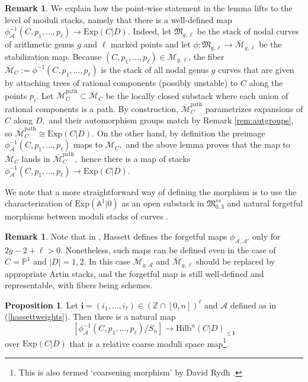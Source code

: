\documentclass[10.5pt]{amsart}
\theoremstyle{definition}
\theoremstyle{definition}
\theoremstyle{definition}
\theoremstyle{definition}
\newtheorem{proposition}[theorem]{Proposition}
\newtheorem{remark}[theorem]{Remark}
\newcommand{\ol}[1]{\overline{#1}}
\newcommand{\Mcal}{\mathcal{M}}
\newcommand{\Mbar}{\ol{\Mcal}}
\newcommand{\Hilb}{\mathrm{Hilb}}
\newcommand{\cA}{\mathcal{A}}
\newcommand{\bi}{\boldsymbol{i}}
\begin{document}
\begin{remark}\label{rem:Aexp}
    We explain how the point-wise statement in the lemma lifts to the level of moduli stacks, namely that there is a well-defined map $\phi^{-1}_{\mathcal{A}}(C, p_1,\dots,p_\ell)\to \mathrm{Exp}(C|D).$ Indeed, let $\mathfrak{M}_{g, \ell}$ be the stack of nodal curves of arithmetic genus $g$ and $\ell$ marked points and let $\phi:\mathfrak{M}_{g,\ell}\to \Mbar_{g, \ell}$ be the stabilization map. Because $(C,p_1,\dots, p_\ell) \in \mathcal{M}_{g,\ell}$,  the fiber $\Mbar_C:=\phi^{-1}(C,p_1,\dots, p_\ell)$ is the stack of all nodal genus $g$ curves that are given by attaching trees of rational components (possibly unstable) to $C$ along the points $p_i$. Let $\Mbar_C^{\mathrm{path}}\subset \Mbar_{C}$ be the locally closed substack where each union of rational components is a path. By construction, $\Mbar_C^{\mathrm{path}}$ parametrizes expansions of $C$ along $D,$ and their automorphism groups match by Remark \ref{rem:autgroups}, so $\Mbar_C^{\mathrm{path}}\cong \mathrm{Exp}(C|D).$ On the other hand, by definition the preimage $\phi_{\mathcal{A}}^{-1}(C, p_1,\dots,p_\ell)$ maps to $\Mbar_{C},$ and the above lemma proves that the map to $\Mbar_{C}$ lands in $\Mbar_{C}^{\mathrm{path}},$ hence there is a map of stacks $\phi_{\mathcal{A}}^{-1}(C, p_1,\dots,p_\ell)\to \mathrm{Exp}(C|D).$
    
    We note that a more straightforward way of defining the morphism is to use the characterization of $\mathrm{Exp}(\mathbb{A}^1|0)$ as an open substack in $\mathfrak{M}_{0,3}^{ss}$ and natural forgetful morphisms between moduli stacks of curves \cite[§2.5]{GraberVakil} \cite[§3.1]{ACFW}.
\end{remark}

\begin{remark}
    Note that in \cite[Therem 4.3]{hassett}, Hassett defines the forgetful maps $\phi_{\cA, \cA'}$ only for $2g-2+\ell>0$. Nonetheless, such maps can be defined even in the case of $C = \mathbb{P}^1$ and $|D| = 1,2$. In this case $\Mbar_{g,\mathcal{A}}$ and $\Mbar_{g,\ell}$ should be replaced by appropriate Artin stacks, and the forgetful map is still well-defined and representable, with fibers being schemes.
\end{remark}


\begin{proposition} \label{prop:quotient} Let $\bi=(i_1,\dots,i_\ell) \in (\mathbb{Z}\cap [0,n])^\ell$ and $\mathcal{A}$ defined as in (\ref{hassettweights}). Then there is a natural map \[[\phi_{\mathcal{A}}^{-1}(C,p_1,\dots,p_\ell)/S_n]\to \Hilb^n(C|D)_{\leq \bi}\]
over $\mathrm{Exp}(C|D)$ that is a relative coarse moduli space map\footnote{This is also termed `coarsening morphism' by David Rydh \cite[Appendix A]{ATWR}.}.
\end{proposition}
\end{document}
